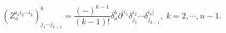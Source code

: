 \begin{equation}
\left( Z_{a}^{i_{1}i_{2}\cdots i_{k}}\right) _{j_{1}\cdots j_{k-1}}^{b}=%
\frac{\left( -\right) ^{k-1}}{\left( k-1\right) !}\delta _{a}^{b}\partial
^{[i_{1}}\delta _{j_{1}}^{i_{2}}\cdots \delta
_{j_{k-1}}^{i_{k}]},\;k=2,\cdots ,n-1.  \label{f16}
\end{equation}

